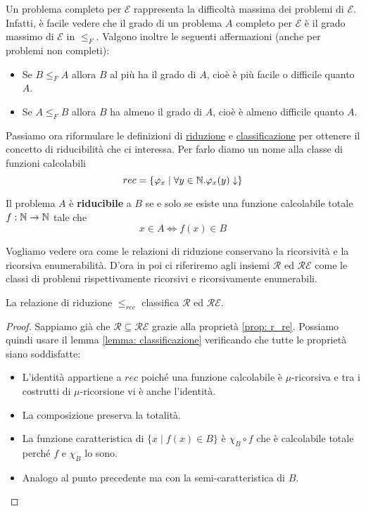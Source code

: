 Un problema completo per $\mathcal{E}$ rappresenta la difficoltà
massima dei problemi di $\mathcal{E}$. Infatti, è facile vedere
che il grado di un problema $A$ completo per $\mathcal{E}$ è il
grado massimo di $\mathcal{E}$ in  $\leq_F$. Valgono inoltre le
seguenti affermazioni (anche per problemi non completi):
\begin{itemize}
	\item Se $B \leq_F A$ allora $B$ al più ha il grado di $A$,
	      cioè è più facile o difficile quanto $A$.
	\item Se $A \leq_F B$ allora $B$ ha almeno il grado di $A$,
	      cioè è almeno difficile quanto $A$.
\end{itemize}
Passiamo ora riformulare le definizioni di
\hyperref[def: riduzione]{riduzione} e
\hyperref[def: classificazione]{classificazione} per ottenere
il concetto di riducibilità che ci interessa. Per farlo diamo
un nome alla classe di funzioni calcolabili
\[ rec = \{ \varphi_x \mid \forall y \in \mathbb{N} . \varphi_x(y) \downarrow \} \]

\begin{definition}
	Il problema $A$ è \textbf{riducibile} a $B$ se e solo se
	esiste una funzione calcolabile totale $f : \mathbb{N} \to \mathbb{N}$ tale
	che
	\[ x \in A \iff f(x) \in B \]
\end{definition}

Vogliamo vedere ora come le relazioni di riduzione conservano la
ricorsività e la ricorsiva enumerabilità. D'ora in poi ci
riferiremo agli insiemi $\mathcal{R}$ ed $\mathcal{RE}$ come le
classi di problemi rispettivamente ricorsivi e ricorsivamente
enumerabili.

\begin{theorem}
	La relazione di riduzione $\leq_{rec}$ classifica
	$\mathcal{R}$ ed $\mathcal{RE}$.
	\begin{proof}
		Sappiamo già che $\mathcal{R} \subseteq \mathcal{RE}$
		grazie alla proprietà \ref{prop: r_re}. Possiamo quindi
		usare il lemma \ref{lemma: classificazione} verificando
		che tutte le proprietà siano soddisfatte:
		\begin{itemize}
			\item L'identità appartiene a $rec$ poiché una
			      funzione calcolabile è $\mu$-ricorsiva e tra
			      i costrutti di $\mu$-ricorsione vi è anche
			      l'identità.
			\item La composizione preserva la totalità.
			\item La funzione caratteristica di
			      $\{ x \mid f(x) \in B \}$ è $\chi_B \circ f$
			      che è calcolabile totale perché $f$ e $\chi_B$
			      lo sono.
			\item Analogo al punto precedente ma con la
			      semi-caratteristica di $B$.
		\end{itemize}
	\end{proof}
\end{theorem}

